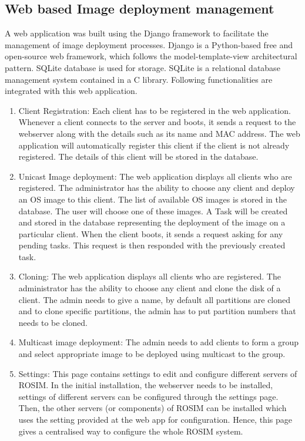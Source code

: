 \documentclass[a4paper,12pt]{article}
\begin{document}
\subsection{Web based Image deployment management}
A web application was built using the Django framework to facilitate the management of image deployment processes. Django is a Python-based free and open-source web framework, which follows the model-template-view architectural pattern. SQLite database is used for storage. SQLite is a relational database management system contained in a C library. Following  functionalities are integrated with this web application.
\begin{enumerate}
     \item   Client Registration: Each client has to be registered in the web application. Whenever a client connects to the server and boots, it sends a request to the webserver along with the details such as its name and MAC address. The web application will automatically register this client if the client is not already registered. The details of this client will be stored in the database.
    
    \item Unicast Image deployment: The web application displays all clients who are registered. The administrator has the ability to choose any client and deploy an OS image to this client. The list of available OS images is stored in the database. The user will choose one of these images. A Task will be created and stored in the database representing the deployment of the image on a particular client. When the client boots, it sends a request asking for any pending tasks. This request is then responded with the previously created task.
    
    \item Cloning: The web application displays all clients who are registered. The administrator has the ability to choose any client and clone the disk of a client. The admin needs to give a name, by default all partitions are cloned and to clone specific partitions, the admin has to put partition numbers that needs to be cloned.
    
    \item Multicast image deployment: The admin needs to add clients to form a group and select appropriate image to be deployed using multicast to the group.
    
    \item Settings: This page contains settings to edit and configure different servers of ROSIM. In the initial installation, the webserver needs to be installed, settings of different servers can be configured through the settings page. Then, the other servers (or components) of ROSIM can be installed which uses the setting provided at the web app for configuration. Hence, this page gives a centralised way to configure the whole ROSIM system.
    
\end{enumerate}
\end{document}
